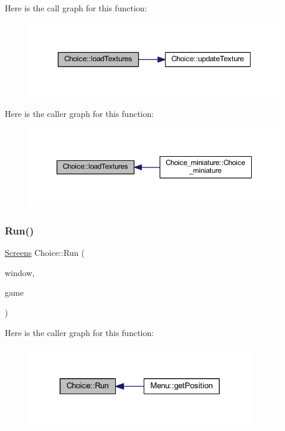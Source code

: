 Here is the call graph for this function\+:\nopagebreak
\begin{figure}[H]
\begin{center}
\leavevmode
\includegraphics[width=338pt]{class_choice_a70d994feb4c3215eb477bae3df7c5052_cgraph}
\end{center}
\end{figure}
Here is the caller graph for this function\+:\nopagebreak
\begin{figure}[H]
\begin{center}
\leavevmode
\includegraphics[width=350pt]{class_choice_a70d994feb4c3215eb477bae3df7c5052_icgraph}
\end{center}
\end{figure}
\mbox{\label{class_choice_aafd399c5b27102d38871a2a886eecd70}} 
\subsubsection{\texorpdfstring{Run()}{Run()}}
{\footnotesize\ttfamily \hyperlink{_globals_8h_a3d5776bab98402b03be09156bacf4f68}{Screens} Choice\+::\+Run (\begin{DoxyParamCaption}\item[{const sf\+::\+Render\+Target \&}]{window,  }\item[{\hyperlink{class_game__window}{Game\+\_\+window} \&}]{game }\end{DoxyParamCaption})}

Here is the caller graph for this function\+:\nopagebreak
\begin{figure}[H]
\begin{center}
\leavevmode
\includegraphics[width=281pt]{class_choice_aafd399c5b27102d38871a2a886eecd70_icgraph}
\end{center}
\end{figure}
\mbox{\label{class_choice_a377e5d456c5c7c7e8914af52cf184a3a}} 
